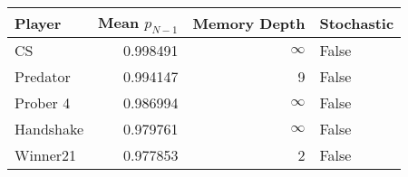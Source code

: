 \begin{tabular}{lrrl}
\toprule
    Player &  Mean $p_{N-1}$ &  Memory Depth & Stochastic \\
\midrule
        CS &        0.998491 &            \(\infty\) &      False \\
  Predator &        0.994147 &             9 &      False \\
  Prober 4 &        0.986994 &            \(\infty\) &      False \\
 Handshake &        0.979761 &            \(\infty\) &      False \\
  Winner21 &        0.977853 &             2 &      False \\
\bottomrule
\end{tabular}
